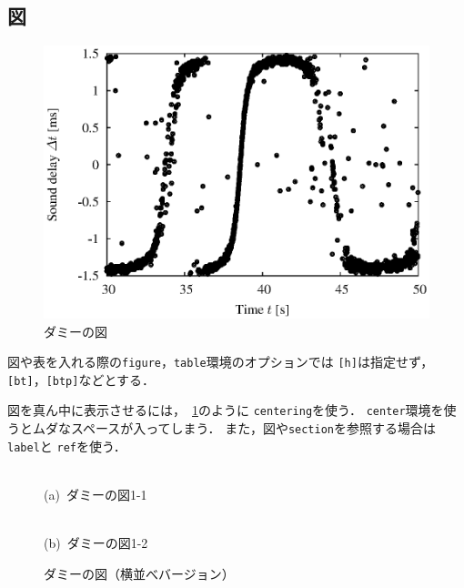 \subsection{図}

\begin{figure}[bt]
 \centering
 \includegraphics[width=\figurewidth]{img/test.eps}
 \caption{ダミーの図}
 \label{fig:test}
\end{figure}

図や表を入れる際の\texttt{figure}，\texttt{table}環境のオプションでは
\texttt{[h]}は指定せず，\texttt{[bt]}，\texttt{[btp]}などとする．

図を真ん中に表示させるには，\figurename~\ref{fig:test}のように
\texttt{\yen centering}を使う．
\texttt{center}環境を使うとムダなスペースが入ってしまう．
また，図や\texttt{section}を参照する場合は\texttt{\yen label}と
\texttt{\yen ref}を使う．

\begin{figure}[bt]
 \centering
 \begin{minipage}[b]{0.49\hsize}
  \centering
  \fbox{\rule{0pt}{2cm}\rule{0.4\figurewidth}{0pt}}\\
  (a)~ダミーの図1-1
 \end{minipage}
 \hfill
 \begin{minipage}[b]{0.49\hsize}
  \centering
  \fbox{\rule{0pt}{2cm}\rule{0.4\figurewidth}{0pt}}\\
  (b)~ダミーの図1-2
 \end{minipage}
 \caption{ダミーの図（横並べバージョン）}
 \label{fig_intro:dummy_fig1}
\end{figure}


